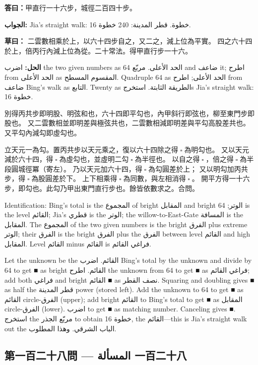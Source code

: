 \documentclass[11pt,a4paper]{article}
\newcommand{\ar}[1]{\arabicfont\beginR #1\endR}
\newcommand{\ChinCol}[1]{\begin{minipage}[t]{0.48\textwidth}#1\end{minipage}}
\newcommand{\ArabCol}[1]{\begin{minipage}[t]{0.48\textwidth}\arabicfont\beginR #1\endR\end{minipage}}
\newcommand{\parallelsection}[2]{%
  \noindent\ChinCol{#1}\hfill\ArabCol{#2}\par\vspace{0.5cm}%
}
\newcommand{\answer}[2]{\par\noindent%
  \begin{minipage}[t]{0.48\textwidth}\textbf{答曰：}#1\end{minipage}%
  \hfill%
  \begin{minipage}[t]{0.48\textwidth}\arabicfont\beginR\textbf{الجواب:} #2\endR\end{minipage}\par\vspace{0.2cm}}
\newcommand{\working}[2]{\par\noindent%
  \begin{minipage}[t]{0.48\textwidth}\textbf{草曰：}#1\end{minipage}%
  \hfill%
  \begin{minipage}[t]{0.48\textwidth}\arabicfont\beginR\textbf{الحل:} #2\endR\end{minipage}\par\vspace{0.2cm}}
\begin{document}
\answer{甲直行一十六步，城徑二百四十步。}{Jia's straight walk: 16 خطوة. قطر المدينة: 240 خطوة.}

\working{%
二雲數相乘於上，以六十四步自之，又二之，減上位為平實。
四之六十四於上，倍丙行內減上位為從。二十常法。得甲直行步一十六。}{%
اضرب the two given numbers as الحد الأعلى. مربّع 64 and ضاعف it; اطرح from الحد الأعلى as المقسوم المسطح. Quadruple 64 as الحد الأعلى; اطرح from ضاعف Bing's walk as التابع. Twenty as الطريقة الثابتة. استخرجs Jia's straight walk: 16 خطوة.}

\parallelsection{%
別得丙共步即明股、明弦和也，六十四即平勾也，內甲斜行即弦也，柳至東門步即股也。
又二雲數相並即明差與極弦共也，二雲數相減即明差與平勾高股差共也。
又平勾內減勾即虛勾也。

立天元一為勾。置丙共步以天元乘之，復以六十四除之得$ \; \square \; $為明勾也。
又以天元減於六十四，得$ \; \square \; $為虛勾也，並虛明二勾$ \; \square \; $為半徑也。
以自之得$ \; \square \; $，倍之得$ \; \square \; $為半段圓城徑冪（寄左）。
乃以天元加六十四，得$ \; \square \; $為勾圓差於上；
又以明勾加丙共步，得$ \; \square \; $為股圓差於下。
上下相乘得$ \; \square \; $為同數，與左相消得$ \; \square \; $。
開平方得一十六步，即勾也。此勾乃甲出東門直行步也。餘皆依數求之。合問。}{%
Identification: Bing's total is the المجموع of bright المقابل and bright الوتر; 64 is the level القائم; Jia's قطري is the الوتر; the willow-to-East-Gate المسافة is the المقابل. The المجموع of the two given numbers is the bright الفرق plus extreme الوتر; their الفرق is the bright الفرق plus the الفرق between level القائم and high المقابل. Level القائم minus القائم is فراغي القائم.

Let the unknown be the القائم. اضرب Bing's total by the unknown and divide by 64 to get ■ as bright القائم. اطرح the unknown from 64 to get ■ as فراغي القائم; add both فراغي and bright القائم ■ as نصف القطر. Squaring and doubling gives ■ as half the قطر المدينة power (stored left). Add the unknown to 64 to get ■ as القائم circle-الفرق (upper); add bright القائم to Bing's total to get ■ as المقابل circle-الفرق (lower). اضرب to get ■ as matching number. Canceling gives ■. استخرج the مربّع الجذر to obtain 16 خطوة, the القائم---this is Jia's straight walk out the الباب الشرقي. وهذا المطلوب.}

\vspace{0.5cm}

\subsection*{第一百二十八問 --- \ar{المسألة 一百二十八}}
\end{document}

